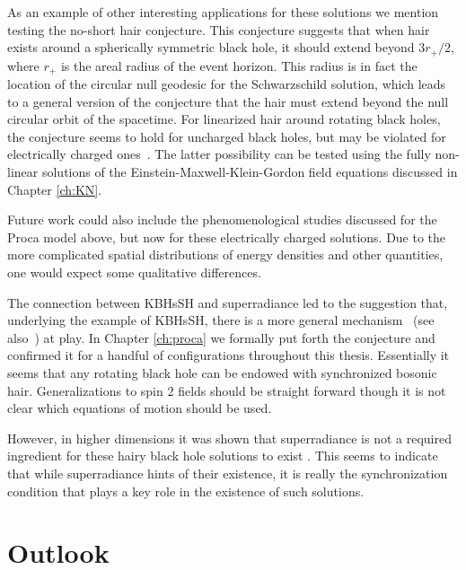 As an example of other interesting applications for these solutions we mention testing the no-short hair conjecture.
This conjecture suggests that when hair exists around a spherically symmetric black hole, it should extend beyond $3r_+/2$, where $r_+$ is the areal radius of the event horizon\cite{Nunez:1996xv}.
This radius is in fact the location of the circular null geodesic for the Schwarzschild solution, which leads to a general version of the conjecture that the hair must extend beyond the null circular orbit of the spacetime\cite{Hod:2011aa}.
For linearized hair around rotating black holes, the conjecture seems to hold for uncharged black holes\cite{Hod:2016dkn}, but may be violated for electrically charged ones~\cite{Hod:2014sha,Hod:2015ynd}.
The latter possibility can be tested using the fully non-linear solutions of the Einstein-Maxwell-Klein-Gordon field equations discussed in Chapter \ref{ch:KN}.

Future work could also include the phenomenological studies discussed for the Proca model above, but now for these electrically charged solutions.
Due to the more complicated spatial distributions of energy densities and other quantities, one would expect some qualitative differences.

\bigskip

The connection between KBHsSH and superradiance led to the suggestion that, underlying the example of KBHsSH, there is a more general mechanism~\cite{Herdeiro:2014goa,Herdeiro:2014ima} (see also~\cite{Herdeiro:2015waa,Herdeiro:2015gia}) at play.
In Chapter \ref{ch:proca} we formally put forth the conjecture and confirmed it for a handful of configurations throughout this thesis.
Essentially it seems that any rotating black hole can be endowed with synchronized bosonic hair.
Generalizations to spin $2$ fields should be straight forward though it is not clear which equations of motion should be used.

However, in higher dimensions it was shown that superradiance is not a required ingredient for these hairy black hole solutions to exist \cite{Brihaye:2014nba,Herdeiro:2015kha}.
This seems to indicate that while superradiance hints of their existence, it is really the synchronization condition that plays a key role in the existence of such solutions.

\chapter{Outlook}
\label{ch:outlook}

